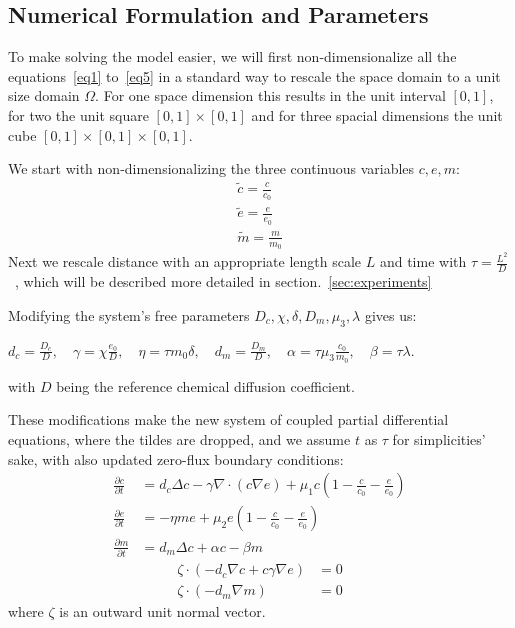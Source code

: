 \subsection{Numerical Formulation and Parameters}

To make solving the model easier, we will first non-dimensionalize all the equations~\ref{eq1} to~\ref{eq5} in a standard way to rescale the space domain to a unit size domain $\Omega$. For one space dimension this results in the unit interval $[0,1]$, for two the unit square $[0,1] \times [0,1]$ and for three spacial dimensions the unit cube $[0,1] \times [0,1] \times [0,1]$.

We start with non-dimensionalizing the three continuous variables $c,e,m$:
\begin{align*}
    \tilde{c} = \frac{c}{c_0} \\
    \tilde{e} = \frac{e}{e_0} \\
    \tilde{m} = \frac{m}{m_0}  
\end{align*}
Next we rescale distance with an appropriate length scale $L$ and time with $\tau = \frac{L^2}{D}$~\cite{anderson_mathematical_2000}, which will be described more detailed in section.~\ref{sec:experiments}

Modifying the system's free parameters $D_c, \chi, \delta, D_m, \mu_3, \lambda$ gives us: 
\begin{center}
    $d_c = \frac{D_c}{D},\quad \gamma = \chi \frac{e_0}{D},\quad \eta = \tau m_0 \delta,\quad d_m = \frac{D_m}{D},\quad \alpha = \tau \mu_3 \frac{c_0}{m_0},\quad \beta = \tau \lambda$.
\end{center} 
with $D$ being the reference chemical diffusion coefficient.

These modifications make the new system of coupled partial differential equations, where the tildes are dropped, and we assume $t$ as $\tau$ for simplicities' sake, with also updated zero-flux boundary conditions:
\begin{align}
	\frac{\partial c}{\partial t} &= d_c \Delta c - \gamma \nabla \cdot (c\nabla e)  + \mu_1 c\left(1-\frac{c}{c_0}-\frac{e}{e_0}\right)\label{eq:6}\\
	\frac{\partial e}{\partial t} &= -\eta m e  + \mu_2 e\left(1-\frac{c}{c_0}-\frac{e}{e_0}\right)\label{eq:7}\\
	\frac{\partial m}{\partial t} &= d_m \Delta c + \alpha c - \beta m\label{eq:8}
\end{align}
\begin{align}
	\zeta \cdot (-d_c \nabla c + c \gamma \nabla e) &= 0\label{eq:9}\\
	\zeta \cdot (-d_m\nabla m ) &= 0\label{eq:10}
\end{align}
where $\zeta$ is an outward unit normal vector.
 

